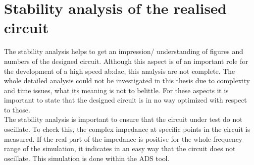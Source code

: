 \section{Stability analysis of the realised circuit}
The stability analysis helps to get an impression/ understanding of figures and numbers of the designed circuit. 
Although this aspect is of an important role for the development of a high speed \gls{ab:dac}, this analysis are not complete.
The whole detailed analysis could not be investigated in this thesis due to complexity and time issues, what its meaning is not to belittle. 
For these aspects it is important to state that the designed circuit is in no way optimized with respect to those.\\
The stability analysis is important to ensure that the circuit under test do not oscillate.  
To check this, the complex impedance at specific points in the circuit is measured. 
If the real part of the impedance is positive for the whole frequency range of the simulation, it indicates in an easy way that the circuit does not oscillate. 
This simulation is done within the ADS tool. 

